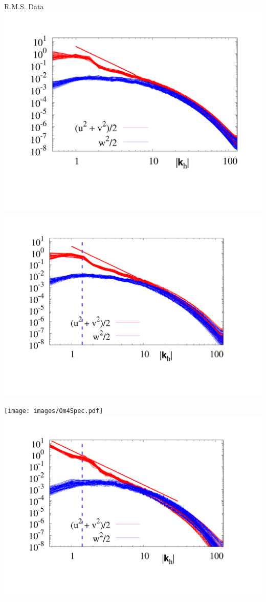 \documentclass{beamer}
\begin{document}
\begin{frame}{R.M.S. Data}
        \centering
        \includegraphics[width=.985\textwidth]{images/Om0.5Spec.pdf}
    \emp
        \centering
        \includegraphics[width=\textwidth]{images/Om1Spec.pdf}
    \emp
    
        \centering
        \texttt{[image: images/Om4Spec.pdf]}
    \emp
        \centering
        \includegraphics[width=1\textwidth]{images/Om5Spec.pdf}
    \emp


\end{frame}
\end{document}
